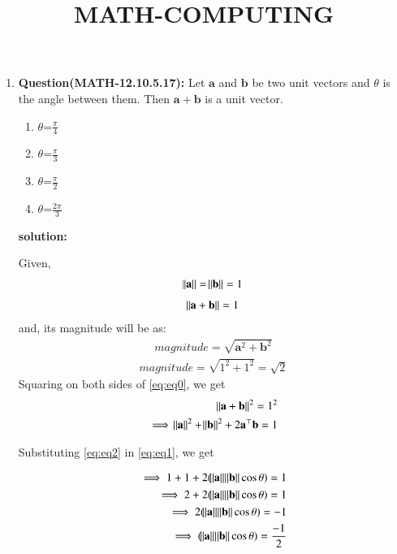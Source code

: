 \documentclass[12pt,-letter paper]{article}
\let\vec\mathbf{}
\let\vec\mathbf{}
\let\vec\mathbf{}
\begin{document}
\title{\textbf{MATH-COMPUTING}}
\maketitle
\begin{enumerate}
 
    \item \textbf{Question(MATH-12.10.5.17):}
       Let $\vec{a}$ and $\vec{b}$ be two unit vectors and $\theta$ is the angle between them. Then $\vec{a}+\vec{b}$ is a unit vector.
    
 \begin{enumerate}[label=(\Alph*)]                     
 \item $\theta$=$\frac{\pi}{4}$
 \item $\theta$=$\frac{\pi}{3}$
  \item $\theta$=$\frac{\pi}{2}$
   \item $\theta$=$\frac{2\pi}{3}$
   \end{enumerate}

 \textbf{solution:}

Given,
\begin{align}
	\norm{\vec{a}} = \norm{\vec{b}}=1 
 \label{eq:eq1}
  \end{align}
 \begin{align}
	\norm{\vec{a}+\vec{b}}=1
 \label{eq:eq0}
 \end{align}
  and, its magnitude will be as:
 \begin{align}
magnitude=\sqrt{\vec{a}^2+\vec{b}^2}
 \end{align}
\begin{align}
magnitude =\sqrt{1^2+1^2}=\sqrt{2}
 \end{align}
Squaring on both sides of \eqref{eq:eq0}, we get
\begin{align}
	\norm{\vec{a}+\vec{b}}^2=1^2
\\	
	\implies \norm{\vec{a}}^2 + \norm{\vec{b}}^2 + 2\vec{a}^{\top}\vec{b} = 1
 \label{eq:eq2}
\end{align}

Substituting \eqref{eq:eq2} in \eqref{eq:eq1}, we get

\begin{align}
	\implies 1+1+2(\norm{\vec{a}}\norm{\vec{b}}\cos{\theta})=1
	\\
	\implies 2+2(\norm{\vec{a}}\norm{\vec{b}}\cos{\theta})=1
        \\
	\implies 2(\norm{\vec{a}}\norm{\vec{b}}\cos{\theta})=-1
	\\
	\implies (\norm{\vec{a}}\norm{\vec{b}}\cos{\theta})=\frac{-1}{2}
 \label{eq:eq3}
\end{align}


\end{enumerate}
\end{document}
